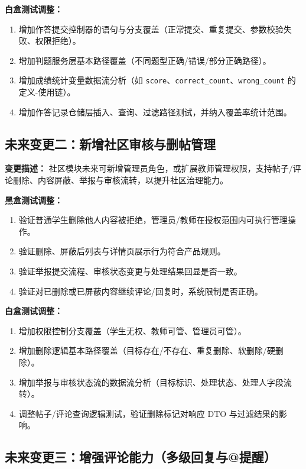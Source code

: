 \documentclass[12pt,a4paper]{ctexart}
\begin{document}
\textbf{白盒测试调整：}
\begin{enumerate}
  \item 增加作答提交控制器的语句与分支覆盖（正常提交、重复提交、参数校验失败、权限拒绝）。
  \item 增加判题服务层基本路径覆盖（不同题型正确/错误/部分正确路径）。
  \item 增加成绩统计变量数据流分析（如 \texttt{score}、\texttt{correct\_count}、\texttt{wrong\_count} 的定义-使用链）。
  \item 增加作答记录仓储层插入、查询、过滤路径测试，并纳入覆盖率统计范围。
\end{enumerate}

\subsection{未来变更二：新增社区审核与删帖管理}

\textbf{变更描述：}
社区模块未来可新增管理员角色，或扩展教师管理权限，支持帖子/评论删除、内容屏蔽、举报与审核流转，以提升社区治理能力。

\textbf{黑盒测试调整：}
\begin{enumerate}
  \item 验证普通学生删除他人内容被拒绝，管理员/教师在授权范围内可执行管理操作。
  \item 验证删除、屏蔽后列表与详情页展示行为符合产品规则。
  \item 验证举报提交流程、审核状态变更与处理结果回显是否一致。
  \item 验证对已删除或已屏蔽内容继续评论/回复时，系统限制是否正确。
\end{enumerate}

\textbf{白盒测试调整：}
\begin{enumerate}
  \item 增加权限控制分支覆盖（学生无权、教师可管、管理员可管）。
  \item 增加删除逻辑基本路径覆盖（目标存在/不存在、重复删除、软删除/硬删除）。
  \item 增加举报与审核状态流的数据流分析（目标标识、处理状态、处理人字段流转）。
  \item 调整帖子/评论查询逻辑测试，验证删除标记对响应 DTO 与过滤结果的影响。
\end{enumerate}

\subsection{未来变更三：增强评论能力（多级回复与@提醒）}
\end{document}
